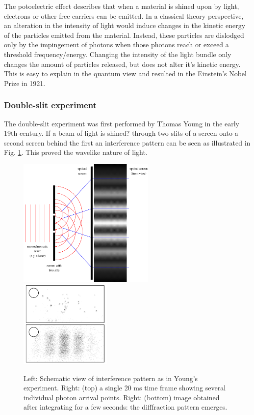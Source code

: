 The potoelectric effect describes that when a material is shined upon by light, electrons or other free carriers can be emitted. In a classical theory perspective, an alteration in the intensity of light would induce changes in the kinetic energy of the particles emitted from the material. Instead, these particles are dislodged only by the impingement of photons when those photons reach or exceed a threshold frequency/energy. Changing the intensity of the light bundle only changes the amount of particles released, but does not alter it's kinetic energy. This is easy to explain in the quantum view and resulted in the Einstein's Nobel Prize in 1921.

\subsubsection{Double-slit experiment}
The double-slit experiment was first performed by Thomas Young in the early 19th century. If a beam of light is shined? through two slits of a screen onto a second screen behind the first an interference pattern can be seen as illustrated in Fig. \ref{fig:doubleslit}. This proved the wavelike nature of light.

\begin{figure}
\includegraphics[width=0.6\textwidth,height=0.5\linewidth]{chapter1/img/younginterference.png}
\includegraphics[width=0.4\textwidth,height=0.5\linewidth]{chapter1/img/doubleslitsinglephoton_crop.png}
\caption{Left: Schematic view of interference pattern as in Young's experiment\cite{shmoop}.  Right: (top) a single 20 ms time frame showing several individual photon arrival points. Right: (bottom) image obtained after integrating for a few seconds: the difffraction pattern emerges\cite{weiswynands:2003}. }
\label{fig:doubleslit}
\end{figure}

